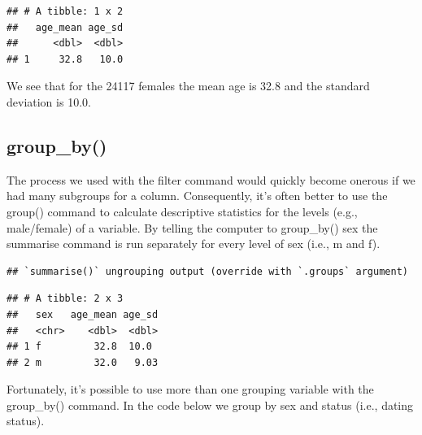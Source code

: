 \documentclass[
]{krantz}
\makeatletter
\newenvironment{Shaded}{\begin{snugshade}}{\end{snugshade}}
\newcommand{\DataTypeTok}[1]{\textcolor[rgb]{0.27,0.27,0.27}{#1}}
\newcommand{\KeywordTok}[1]{\textcolor[rgb]{0.27,0.27,0.27}{\textbf{#1}}}
\newcommand{\NormalTok}[1]{#1}
\newcommand{\OperatorTok}[1]{\textcolor[rgb]{0.43,0.43,0.43}{\textbf{#1}}}
\newcommand{\OtherTok}[1]{\textcolor[rgb]{0.37,0.37,0.37}{#1}}
\newcommand{\StringTok}[1]{\textcolor[rgb]{0.5,0.5,0.5}{#1}}
\newenvironment{kframe}{%
\medskip{}
\setlength{\fboxsep}{.8em}
 \def\at@end@of@kframe{}%
 \ifinner\ifhmode%
  \def\at@end@of@kframe{\end{minipage}}%
  \begin{minipage}{\columnwidth}%
 \fi\fi%
 \def\FrameCommand##1{\hskip\@totalleftmargin \hskip-\fboxsep
 \colorbox{shadecolor}{##1}\hskip-\fboxsep
     \hskip-\linewidth \hskip-\@totalleftmargin \hskip\columnwidth}%
 \MakeFramed {\advance\hsize-\width
   \@totalleftmargin\z@ \linewidth\hsize
   \@setminipage}}%
 {\par\unskip\endMakeFramed%
 \at@end@of@kframe}
\renewenvironment{Shaded}{\begin{kframe}}{\end{kframe}}
\makeatother
\begin{document}
\begin{verbatim}
## # A tibble: 1 x 2
##   age_mean age_sd
##      <dbl>  <dbl>
## 1     32.8   10.0
\end{verbatim}

We see that for the 24117 females the mean age is 32.8 and the standard deviation is 10.0.

\hypertarget{group_by}{%
\subsection{group\_by()}\label{group_by}}

The process we used with the filter command would quickly become onerous if we had many subgroups for a column. Consequently, it's often better to use the group() command to calculate descriptive statistics for the levels (e.g., male/female) of a variable. By telling the computer to group\_by() sex the summarise command is run separately for every level of sex (i.e., m and f).

\begin{Shaded}
\end{Shaded}

\begin{verbatim}
## `summarise()` ungrouping output (override with `.groups` argument)
\end{verbatim}

\begin{verbatim}
## # A tibble: 2 x 3
##   sex   age_mean age_sd
##   <chr>    <dbl>  <dbl>
## 1 f         32.8  10.0 
## 2 m         32.0   9.03
\end{verbatim}

Fortunately, it's possible to use more than one grouping variable with the group\_by() command. In the code below we group by sex and status (i.e., dating status).

\begin{Shaded}
\end{Shaded}
\end{document}
